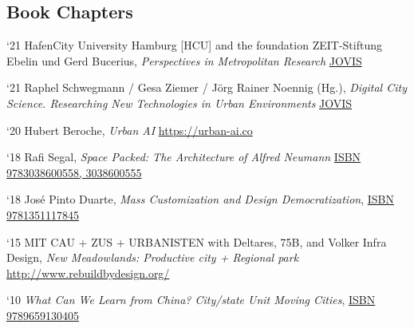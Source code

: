 \subsection*{Book Chapters}

\begin{tablist}
    \item[`21] \tab HafenCity University Hamburg [HCU] and the foundation ZEIT-Stiftung Ebelin und Gerd Bucerius, \textit{Perspectives in Metropolitan Research}
    \href{https://www.jovis.de/en/books/series/perspectives-in-metropolitan-research.html}{JOVIS}

    \item[`21] \tab Raphel Schwegmann / Gesa Ziemer / Jörg Rainer Noennig (Hg.), \textit{Digital City Science. Researching New Technologies in Urban Environments}
    \href{https://www.jovis.de/de/buecher/details/product/digital-city-science-researching-new-technologies-in-urban-environments.html}{JOVIS}

    \item[`20] \tab Hubert Beroche, \textit{Urban AI}
    \href{https://urban-ai.co/wp-content/uploads/2020/06/URBAN-AI-1.pdf}{https://urban-ai.co}

    \item[`18] \tab Rafi Segal, \textit{Space Packed: The Architecture of Alfred Neumann}
    \href{https://www.amazon.com/Space-Packed-Architecture-Alfred-Neumann/dp/3038600555}{ISBN 9783038600558, 3038600555}


    \item[`18] \tab José Pinto Duarte, \textit{Mass Customization and Design Democratization},
    \href{https://www.google.com/books/edition/_/Z6h8DwAAQBAJ?hl=en&gbpv=0}{ISBN 9781351117845}


    \item[`15] \tab MIT CAU + ZUS + URBANISTEN with Deltares, 75B, and Volker Infra Design, \textit{New Meadowlands: Productive city + Regional park}
    \href{http://www.rebuildbydesign.org/our-work/all-proposals/winning-projects/nj-meadowlands}{http://www.rebuildbydesign.org/}

    \item[`10] \tab \textit{What Can We Learn from China? City/state Unit Moving Cities},
    \href{https://movingcities.org/movingmemos/the-chinese-city-lecture-workshop/}{ISBN 9789659130405}


\end{tablist}

